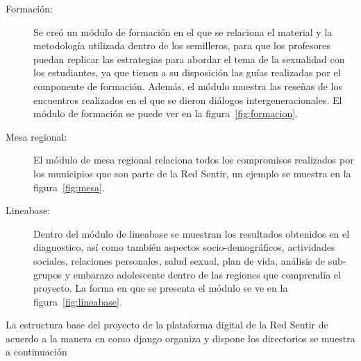\documentclass[a4paper]{article}
\begin{document}
\begin{description}
\item[Formación:] Se creó un módulo de formación en el que se relaciona el material y la metodología utilizada dentro de los semilleros, para que los profesores puedan replicar las estrategias para abordar el tema de la sexualidad con los estudiantes, ya que tienen a su disposición las guías realizadas por el componente de formación. Además, el módulo muestra las reseñas de los encuentros realizados en el que se dieron diálogos intergeneracionales. El módulo de formación se puede ver en la figura~\ref{fig:formacion}.

\item[Mesa regional:] El módulo de mesa regional relaciona todos los compromisos realizados por los municipios que son parte de la Red Sentir, un ejemplo se muestra en la figura~\ref{fig:mesa}.

\item[Lineabase:] Dentro del módulo de lineabase se muestran los resultados obtenidos en el diagnostico, así como también aspectos socio-demográficos, actividades sociales, relaciones personales, salud sexual, plan de vida, análisis de sub-grupos y embarazo adolescente dentro de las regiones que comprendía el proyecto. La forma en que se presenta el módulo se ve en la figura~\ref{fig:lineabase}.

\end{description}

La estructura base del proyecto de la plataforma digital de la Red Sentir de acuerdo a la manera en como django organiza y dispone los directorios se muestra a continuación
\end{document}
